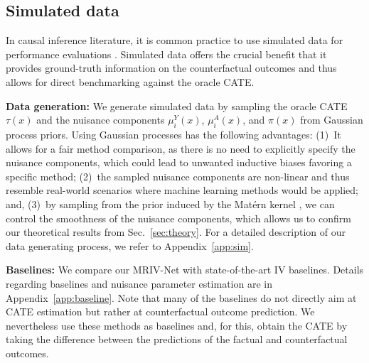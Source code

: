 \documentclass{article} %
\newcommand{\modelname}{\mbox{MRIV-Net}\xspace}
\theoremstyle{definition}
\theoremstyle{plain}
\begin{document}
\subsection{Simulated data}\label{sec:exp_sim}

In causal inference literature, it is common practice to use simulated data for performance evaluations \citep{Bica.2020, Curth.2021, Hartford.2017}. Simulated data offers the crucial benefit that it provides ground-truth information on the counterfactual outcomes and thus allows for direct benchmarking against the oracle CATE.

\textbf{Data generation:}
We generate simulated data by sampling the oracle CATE $\tau(x)$ and the nuisance components $\mu_i^Y(x)$, $\mu_i^A(x)$, and $\pi(x)$ from Gaussian process priors. Using Gaussian processes has the following advantages: (1)~It allows for a fair method comparison, as there is no need to explicitly specify the nuisance components, which could lead to unwanted inductive biases favoring a specific method; (2)~the sampled nuisance components are non-linear and thus resemble real-world scenarios where machine learning methods would be applied; and, (3)~by sampling from the prior induced by the Mat{\'e}rn kernel \citep{Rasmussen.2008}, we can control the smoothness of the nuisance components, which allows us to confirm our theoretical results from Sec.~\ref{sec:theory}.
For a detailed description of our data generating process, we refer to Appendix~\ref*{app:sim}.

\textbf{Baselines:}
We compare our \modelname with state-of-the-art IV baselines. Details regarding baselines and nuisance parameter estimation are in Appendix~\ref*{app:baseline}. Note that many of the baselines do not directly aim at CATE estimation but rather at counterfactual outcome prediction. We nevertheless use these methods as baselines and, for this, obtain the CATE by taking the difference between the predictions of the factual and counterfactual outcomes.
\end{document}
